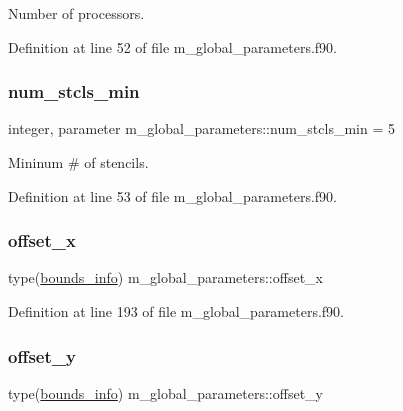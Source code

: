 Number of processors. 



Definition at line 52 of file m\+\_\+global\+\_\+parameters.\+f90.

\mbox{\label{namespacem__global__parameters_a71f091e6074e6c248fd7e03218b89218}} 
\subsubsection{\texorpdfstring{num\+\_\+stcls\+\_\+min}{num\_stcls\_min}}
{\footnotesize\ttfamily integer, parameter m\+\_\+global\+\_\+parameters\+::num\+\_\+stcls\+\_\+min = 5}



Mininum \# of stencils. 



Definition at line 53 of file m\+\_\+global\+\_\+parameters.\+f90.

\mbox{\label{namespacem__global__parameters_a5f209d71bd815d863485787639d9684a}} 
\subsubsection{\texorpdfstring{offset\+\_\+x}{offset\_x}}
{\footnotesize\ttfamily type(\hyperlink{structm__derived__types_1_1bounds__info}{bounds\+\_\+info}) m\+\_\+global\+\_\+parameters\+::offset\+\_\+x}



Definition at line 193 of file m\+\_\+global\+\_\+parameters.\+f90.

\mbox{\label{namespacem__global__parameters_a576bd60474fdaccd3ee42edaaabddefa}} 
\subsubsection{\texorpdfstring{offset\+\_\+y}{offset\_y}}
{\footnotesize\ttfamily type(\hyperlink{structm__derived__types_1_1bounds__info}{bounds\+\_\+info}) m\+\_\+global\+\_\+parameters\+::offset\+\_\+y}



